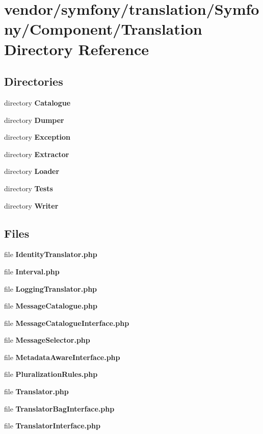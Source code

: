 \section{vendor/symfony/translation/\+Symfony/\+Component/\+Translation Directory Reference}
\label{dir_ce2f4987bcbf77ad3ff12612f9142d04}
\subsection*{Directories}
\begin{DoxyCompactItemize}
\item 
directory {\bf Catalogue}
\item 
directory {\bf Dumper}
\item 
directory {\bf Exception}
\item 
directory {\bf Extractor}
\item 
directory {\bf Loader}
\item 
directory {\bf Tests}
\item 
directory {\bf Writer}
\end{DoxyCompactItemize}
\subsection*{Files}
\begin{DoxyCompactItemize}
\item 
file {\bf Identity\+Translator.\+php}
\item 
file {\bf Interval.\+php}
\item 
file {\bf Logging\+Translator.\+php}
\item 
file {\bf Message\+Catalogue.\+php}
\item 
file {\bf Message\+Catalogue\+Interface.\+php}
\item 
file {\bf Message\+Selector.\+php}
\item 
file {\bf Metadata\+Aware\+Interface.\+php}
\item 
file {\bf Pluralization\+Rules.\+php}
\item 
file {\bf Translator.\+php}
\item 
file {\bf Translator\+Bag\+Interface.\+php}
\item 
file {\bf Translator\+Interface.\+php}
\end{DoxyCompactItemize}
